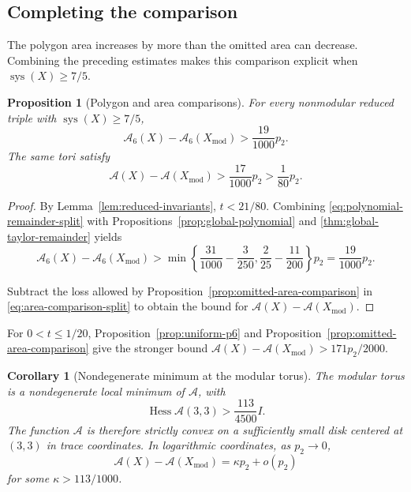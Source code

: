 \documentclass[10pt,twoside]{article}
\theoremstyle{plain}
\newtheorem{proposition}[theorem]{Proposition}
\newtheorem{corollary}[theorem]{Corollary}
\theoremstyle{definition}
\theoremstyle{remark}
\DeclareMathOperator{\Hess}{Hess}
\DeclareMathOperator{\sys}{sys}
\newcommand{\A}{\mathcal A}
\newcommand{\Xmod}{X_{\mathrm{mod}}}
\begin{document}
\subsection{Completing the comparison}
The polygon area increases by more than the omitted area can decrease.
Combining the preceding estimates makes this comparison explicit
when $\sys(X)\geq7/5$.
\begin{proposition}[Polygon and area comparisons]
\label{prop:global-polygon-comparison}
For every nonmodular reduced triple with $\sys(X)\geq7/5$,
$$
\A_6(X)-\A_6(\Xmod)>\frac{19}{1000}p_2.
$$
The same tori satisfy
\begin{equation}
\label{eq:large-systole-comparison}
\A(X)-\A(\Xmod)>\frac{17}{1000}p_2>\frac1{80}p_2.
\end{equation}
\end{proposition}

\begin{proof}
By Lemma~\ref{lem:reduced-invariants}, $t<21/80$. Combining
\eqref{eq:polynomial-remainder-split} with
Propositions~\ref{prop:global-polynomial} and
\ref{thm:global-taylor-remainder} yields
$$
\A_6(X)-\A_6(\Xmod)>
\min\left\{
\frac{31}{1000}-\frac3{250},
\frac2{25}-\frac{11}{200}
\right\}p_2
=\frac{19}{1000}p_2.
$$

Subtract the loss allowed by
Proposition~\ref{prop:omitted-area-comparison} in
\eqref{eq:area-comparison-split} to obtain the bound for
$\A(X)-\A(\Xmod)$.
\end{proof}

For $0<t\leq1/20$, Proposition~\ref{prop:uniform-p6} and
Proposition~\ref{prop:omitted-area-comparison} give the stronger
bound $\A(X)-\A(\Xmod)>171p_2/2000$.

\begin{corollary}[Nondegenerate minimum at the modular torus]
\label{cor:modular-minimum}
The modular torus is a nondegenerate local minimum of $\A$, with
$$
\Hess\A(3,3)>\frac{113}{4500}I.
$$
The function $\A$ is therefore strictly convex on a sufficiently small disk
centered at $(3,3)$ in trace coordinates.
In logarithmic coordinates, as $p_2\to0$,
$$
\A(X)-\A(\Xmod)=\kappa p_2+o(p_2)
$$
for some $\kappa>113/1000$.
\end{corollary}
\end{document}
